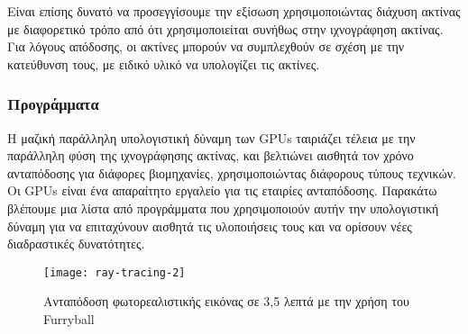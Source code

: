 Είναι επίσης δυνατό να προσεγγίσουμε την εξίσωση χρησιμοποιώντας διάχυση ακτίνας με διαφορετικό τρόπο από ότι χρησιμοποιείται συνήθως στην ιχνογράφηση ακτίνας. Για λόγους απόδοσης, οι ακτίνες μπορούν να συμπλεχθούν σε σχέση με την κατεύθυνση τους, με ειδικό υλικό να υπολογίζει τις ακτίνες.

\subsubsection{Προγράμματα}
Η μαζική παράλληλη υπολογιστική δύναμη των GPUs ταιριάζει τέλεια με την παράλληλη φύση της ιχνογράφησης ακτίνας, και βελτιώνει αισθητά τον χρόνο ανταπόδοσης για διάφορες βιομηχανίες, χρησιμοποιώντας διάφορους τύπους τεχνικών. Οι GPUs είναι ένα απαραίτητο εργαλείο για τις εταιρίες ανταπόδοσης. Παρακάτω βλέπουμε μια λίστα από προγράμματα που χρησιμοποιούν αυτήν την υπολογιστική δύναμη για να επιταχύνουν αισθητά τις υλοποιήσεις τους και να ορίσουν νέες διαδραστικές δυνατότητες.

\begin{figure}[h]
\centering
\texttt{[image: ray-tracing-2]}
\caption{Ανταπόδοση φωτορεαλιστικής εικόνας σε 3,5 λεπτά με την χρήση του Furryball}
\end{figure}


